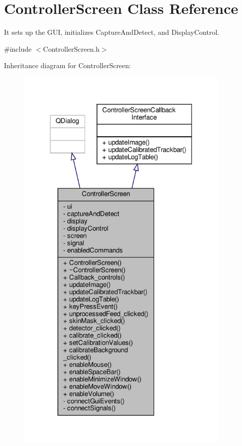 \hypertarget{class_controller_screen}{}\section{Controller\+Screen Class Reference}
\label{class_controller_screen}


It sets up the G\+UI, initializes Capture\+And\+Detect, and Display\+Control.  




{\ttfamily \#include $<$Controller\+Screen.\+h$>$}



Inheritance diagram for Controller\+Screen\+:
\nopagebreak
\begin{figure}[H]
\begin{center}
\leavevmode
\includegraphics[height=550pt]{class_controller_screen__inherit__graph}
\end{center}
\end{figure}


